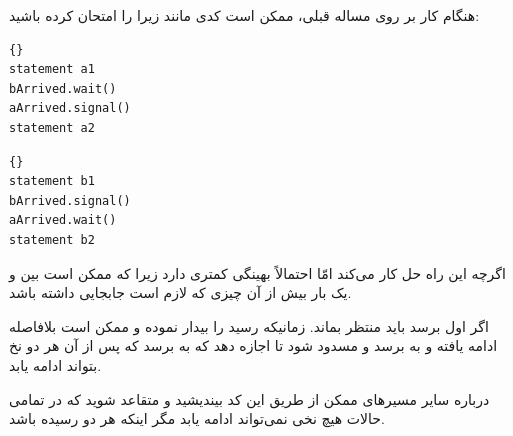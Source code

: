 \documentclass{book}
\begin{document}
    هنگام کار بر روی مساله قبلی، ممکن است کدی مانند زیرا را امتحان کرده باشید:

\begin{latin}
\begin{minipage}[t]{2in}
\begin{latin}
\begin{lstlisting}[title=\rl{نخ \lr{A}}]{}
statement a1
bArrived.wait()
aArrived.signal()
statement a2
\end{lstlisting}
\end{latin}
\end{minipage}
\hfill
\begin{minipage}[t]{2in}
\begin{latin}
\begin{lstlisting}[title=\rl{نخ \lr{B}}]{}
statement b1
bArrived.signal()
aArrived.wait()
statement b2
\end{lstlisting}
\end{latin}
\end{minipage}
\end{latin}

    اگرچه این راه حل کار می‌کند امّا احتمالاً  بهینگی کمتری دارد زیرا که ممکن است بین   و  یک بار بیش از آن چیزی که لازم است 
    جابجایی داشته باشد. 

    اگر اول     برسد باید منتظر    بماند. زمانیکه     رسید      را بیدار نموده و ممکن است بلافاصله 
    ادامه یافته و به    برسد و مسدود شود تا اجازه دهد که      به   برسد که پس از آن 
    هر دو نخ بتواند ادامه یابد. 

    درباره سایر مسیرهای ممکن از طریق این کد بیندیشید و متقاعد شوید که در تمامی حالات هیچ نخی نمی‌تواند ادامه یابد مگر اینکه هر دو رسیده باشد. 

\end{document}

